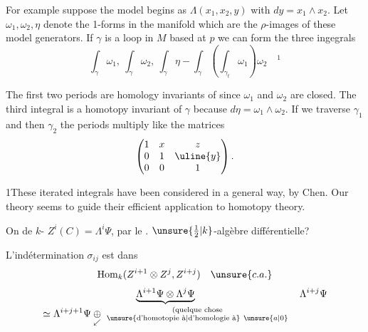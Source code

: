 For example suppose the model begins as $\Lambda(x_1,x_2,y)$
with $dy=x_1\wedge x_2$. Let $\omega_1,\omega_2,\eta$ denote the 1-forms in
the manifold which are the $\rho$-images of these model generators.
If $\gamma$ is a loop in $M$ based at $p$ we can form the three
ingegrals
\[
\int_\gamma\omega_1,\ \int_\gamma\omega_2,\
\int_\gamma\eta-\int_\gamma\left(\int_{\gamma_t}\omega_1\right)\omega_2
\quad{}^1
\]

The first two periods are homology invariants of
since $\omega_1$ and $\omega_2$ are closed. The third integral is a
homotopy invariant of $\gamma$ because $d\eta=\omega_1\wedge\omega_2$. If we
traverse $\gamma_1$ and then $\gamma_2$ the periods multiply like the
matrices
\[
\begin{pmatrix}1&x&z\\0&1&\uline{y}\\0&0&1\end{pmatrix}.
\]


1\quad These iterated integrals have been considered in
a general way, by Chen. Our theory seems to guide
their efficient application to homotopy theory.

\deleted{\[
\unsure{Z^iC^j}=\Lambda^i\Psi\times\Lambda^{j+1}\Phi
\longrightarrow\unsure{C^{i+j}}=\Lambda^{i+j+1}\Phi
\]}

On  de $k$-
 $Z^i(C)=\Lambda^i\Psi$, par le
. 
 $\unsure{\frac12|k}$-algèbre différentielle?

\margin{$\big]$}

L'indétermination  $\sigma_{ij}$ est dans
\[
\operatorname{Hom}_k(Z^{i+1}\otimes Z^j,Z^{i+j})\quad\unsure{c.a.}
\]
\[
\underbrace{\Lambda^{i+1}\Psi\otimes\Lambda^j\Psi}_
{\displaystyle\simeq\Lambda^{i+j+1}\Psi\underset{\swarrow}{\oplus}\ \substack{\text{(quelque chose}\\\text{\unsure{d'homotopie à|d'homologie à}}\ \unsure{a|0}}}
\quad\Lambda^{i+j}\Psi
\]

